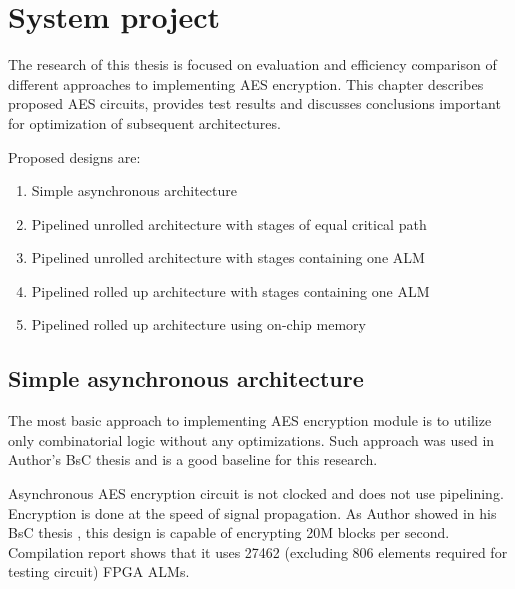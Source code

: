 \section{System project}
\label{sec:system-project}
The research of this thesis is focused on evaluation and efficiency comparison of different approaches to implementing AES encryption. This chapter describes  proposed AES circuits, provides test results and discusses conclusions important for optimization of
subsequent architectures.

Proposed designs are:
\begin{enumerate}
\item Simple asynchronous architecture
\item Pipelined unrolled architecture with stages of equal critical path
\item Pipelined unrolled architecture with stages containing one ALM
\item Pipelined rolled up architecture with stages containing one ALM
\item Pipelined rolled up architecture using on-chip memory


\end{enumerate}

\subsection{Simple asynchronous architecture}
The most basic approach to implementing AES encryption module is to utilize only combinatorial logic without any optimizations. Such approach was used in Author's BsC thesis \cite{inzynierka} and is a good baseline for this research.

Asynchronous AES encryption circuit is not clocked and does not use pipelining. Encryption is done at the speed of signal propagation. As Author showed in his BsC thesis \cite{inzynierka}, this design is capable of encrypting 20M blocks per second. Compilation report shows that it uses 27462 (excluding 806 elements required for testing circuit) FPGA ALMs.



